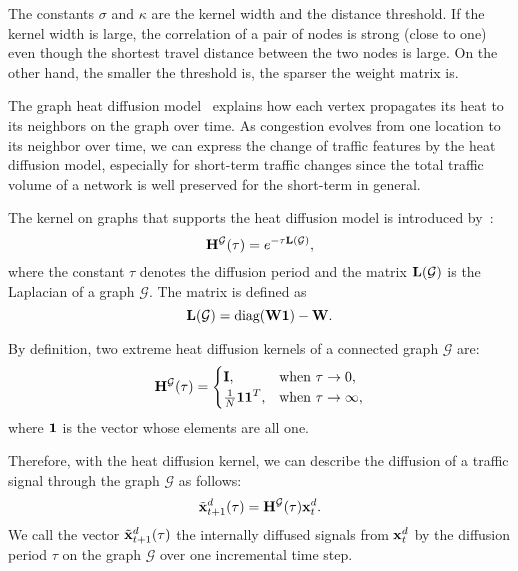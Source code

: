 \documentclass[journal]{IEEEtran}
\begin{document}
The constants $\sigma$ and $\kappa$ are the kernel width and the distance threshold.
If the kernel width is large, the correlation of a pair of nodes is strong (close to one) even though the shortest travel distance between the two nodes is large. 
On the other hand, the smaller the threshold is, the sparser the weight matrix is.






The graph heat diffusion model~\cite{kondor2002diffusion} explains how each vertex propagates its heat to its neighbors on the graph over time.
As congestion evolves from one location to its neighbor over time, we can express the change of traffic features by the heat diffusion model, especially for short-term traffic changes since the total traffic volume of a network is well preserved for the short-term in general.




The kernel on graphs that supports the heat diffusion model is introduced by~\cite{kondor2002diffusion}:
\begin{equation}\label{eqn:heat_diffusion_model}
    {\bf{H}}^{\mathcal{G}}(\tau)=e^{-\tau{\bf{L(\mathcal{G})}}},
\end{equation}
where the constant $\tau$ denotes the diffusion period and the matrix ${\bf{L}}(\mathcal{G})$ is the Laplacian of a graph $\mathcal{G}$. The matrix is defined as
\begin{equation}\label{eqn:laplacian}
    {\bf{L}}(\mathcal{G})=\text{diag}({\bf{W}}{\bf{1}})-{\bf{W}}.
\end{equation}



By definition, two extreme heat diffusion kernels of a connected graph $\mathcal{G}$ are:
\begin{equation}\label{eqn:extreme_prior}
    {\bf{H}}^{\mathcal{G}}(\tau)=
    \begin{cases}
      {\bf{I}}, & \text{when}\ \tau\rightarrow0, \\
      \frac{1}{N}{\bf{11}}^T, & \text{when}\ \tau\rightarrow\infty,
    \end{cases}
\end{equation}
where ${\bf{1}}$ is the vector whose elements are all one.

Therefore, with the heat diffusion kernel, we can describe the diffusion of a traffic signal through the graph $\mathcal{G}$ as follows: 
\begin{equation}\label{eqn:internal_diffusion}
    {\tilde{\bf{x}}}_{t+1}^d(\tau)={\bf{H}}^{\mathcal{G}}(\tau){\bf{x}}_t^d.
\end{equation}
We call the vector ${\tilde{\bf{x}}}^d_{t+1}(\tau)$ the internally diffused signals from ${\bf{x}}_t^d$ by the diffusion period $\tau$ on the graph $\mathcal{G}$ over one incremental time step.
\end{document}
